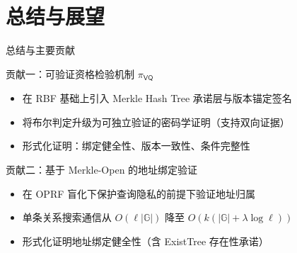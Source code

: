 \section{总结与展望}

\begin{frame}{总结与主要贡献}

  \begin{block}{贡献一：可验证资格检验机制 $\pi_\mathsf{VQ}$}
    \small
    \begin{itemize}[noitemsep, topsep=1pt]
      \item 在 RBF 基础上引入 Merkle Hash Tree 承诺层与版本锚定签名
      \item 将布尔判定升级为可独立验证的密码学证明（支持双向证据）
      \item 形式化证明：绑定健全性、版本一致性、条件完整性
    \end{itemize}
  \end{block}

  \vspace{0.25em}
  \begin{block}{贡献二：基于 Merkle-Open 的地址绑定验证}
    \small
    \begin{itemize}[noitemsep, topsep=1pt]
      \item 在 OPRF 盲化下保护查询隐私的前提下验证地址归属
      \item 单条关系搜索通信从 $O(\ell|\mathbb{G}|)$ 降至 $O(k(|\mathbb{G}|+\lambda\log\ell))$
      \item 形式化证明地址绑定健全性（含 ExistTree 存在性承诺）
    \end{itemize}
  \end{block}

\end{frame}

